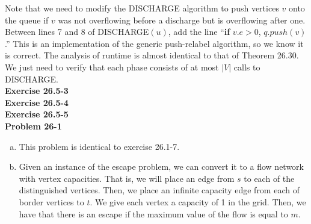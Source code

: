 \documentclass{article}
\begin{document}
Note that we need to modify the DISCHARGE algorithm to push vertices $v$ onto the queue if $v$ was not overflowing before a discharge but is overflowing after one.  Between lines 7 and 8 of DISCHARGE$(u)$, add the line ``\textbf{if} $v.e > 0$, $q.push(v)$.''  This is an implementation of the generic push-relabel algorithm, so we know it is correct.  The analysis of runtime is almost identical to that of Theorem 26.30. We just need to verify that each phase consists of at most $|V|$ calls to DISCHARGE.\\




\noindent\textbf{Exercise 26.5-3}\\

\noindent\textbf{Exercise 26.5-4}\\



\noindent\textbf{Exercise 26.5-5}\\



\noindent\textbf{Problem 26-1}\\

\begin{enumerate}[a.]
\item
This problem is identical to exercise 26.1-7.
\item
Given an instance of the escape problem, we can convert it to a flow network with vertex capacities. That is, we will place an edge from $s$ to each of the distinguished vertices. Then, we place an infinite capacity edge from each of border vertices to $t$. We give each vertex a capacity of 1 in the grid. Then, we have that there is an escape if the maximum value of the flow is equal to $m$.

\end{enumerate}
\end{document}
